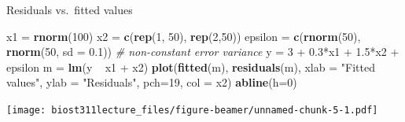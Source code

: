 \documentclass[12pt,ignorenonframetext,]{beamer}
\newenvironment{Shaded}{\begin{snugshade}}{\end{snugshade}}
\newcommand{\KeywordTok}[1]{\textcolor[rgb]{0.13,0.29,0.53}{\textbf{{#1}}}}
\newcommand{\DataTypeTok}[1]{\textcolor[rgb]{0.13,0.29,0.53}{{#1}}}
\newcommand{\DecValTok}[1]{\textcolor[rgb]{0.00,0.00,0.81}{{#1}}}
\newcommand{\FloatTok}[1]{\textcolor[rgb]{0.00,0.00,0.81}{{#1}}}
\newcommand{\StringTok}[1]{\textcolor[rgb]{0.31,0.60,0.02}{{#1}}}
\newcommand{\CommentTok}[1]{\textcolor[rgb]{0.56,0.35,0.01}{\textit{{#1}}}}
\newcommand{\NormalTok}[1]{{#1}}
\begin{document}
\begin{frame}[fragile]{Residuals vs.~fitted values}

\tiny

\begin{Shaded}
\begin{Highlighting}[]
\NormalTok{x1 =}\StringTok{ }\KeywordTok{rnorm}\NormalTok{(}\DecValTok{100}\NormalTok{)}
\NormalTok{x2 =}\StringTok{ }\KeywordTok{c}\NormalTok{(}\KeywordTok{rep}\NormalTok{(}\DecValTok{1}\NormalTok{, }\DecValTok{50}\NormalTok{), }\KeywordTok{rep}\NormalTok{(}\DecValTok{2}\NormalTok{,}\DecValTok{50}\NormalTok{))}
\NormalTok{epsilon =}\StringTok{ }\KeywordTok{c}\NormalTok{(}\KeywordTok{rnorm}\NormalTok{(}\DecValTok{50}\NormalTok{), }\KeywordTok{rnorm}\NormalTok{(}\DecValTok{50}\NormalTok{, }\DataTypeTok{sd =} \FloatTok{0.1}\NormalTok{)) }\CommentTok{# non-constant error variance}
\NormalTok{y =}\StringTok{ }\DecValTok{3} \NormalTok{+}\StringTok{ }\FloatTok{0.3}\NormalTok{*x1 +}\StringTok{ }\FloatTok{1.5}\NormalTok{*x2 +}\StringTok{ }\NormalTok{epsilon}
\NormalTok{m =}\StringTok{ }\KeywordTok{lm}\NormalTok{(y ~}\StringTok{ }\NormalTok{x1 +}\StringTok{ }\NormalTok{x2)}
\KeywordTok{plot}\NormalTok{(}\KeywordTok{fitted}\NormalTok{(m), }\KeywordTok{residuals}\NormalTok{(m), }\DataTypeTok{xlab =} \StringTok{"Fitted values"}\NormalTok{, }\DataTypeTok{ylab =} \StringTok{"Residuals"}\NormalTok{, }\DataTypeTok{pch=}\DecValTok{19}\NormalTok{, }\DataTypeTok{col =} \NormalTok{x2)}
\KeywordTok{abline}\NormalTok{(}\DataTypeTok{h=}\DecValTok{0}\NormalTok{)}
\end{Highlighting}
\end{Shaded}

\texttt{[image: biost311lecture\_files/figure-beamer/unnamed-chunk-5-1.pdf]}

\normalsize

\end{frame}
\end{document}
